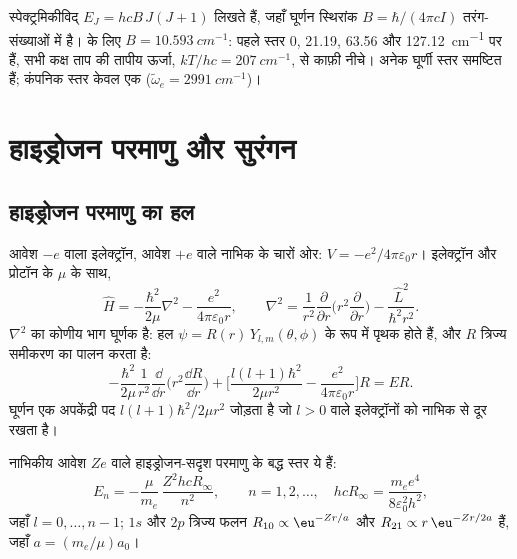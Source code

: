 \begin{example}[\ce{HCl} के घूर्णी स्तर]\label{ex:b3:quantum-model-systems:hcl}
स्पेक्ट्रमिकीविद् $E_J = hcB\,J(J+1)$ लिखते हैं, जहाँ घूर्णन स्थिरांक $B =
\hbar/(4\pi cI)$ तरंग-संख्याओं में है।  के लिए $B = \qty{10.593}{cm^{-1}}$:
पहले स्तर 0, 21.19, 63.56 और \qty{127.12}{cm^{-1}} पर हैं, सभी
कक्ष ताप की तापीय ऊर्जा, $kT/hc = \qty{207}{cm^{-1}}$, से काफ़ी नीचे।
अनेक घूर्णी स्तर समष्टित हैं; कंपनिक स्तर केवल एक
($\tilde\omega_e = \qty{2991}{cm^{-1}}$)।
\end{example}

\section{हाइड्रोजन परमाणु और सुरंगन}

\subsection*{हाइड्रोजन परमाणु का हल}

आवेश $-e$ वाला इलेक्ट्रॉन, आवेश $+e$ वाले नाभिक के चारों ओर: $V = -e^2/
4\pi\varepsilon_0r$। इलेक्ट्रॉन और प्रोटॉन के  $\mu$ के साथ,
\[
\hat H = -\frac{\hbar^2}{2\mu}\nabla^2 - \frac{e^2}{4\pi\varepsilon_0r},\qquad
\nabla^2 = \frac{1}{r^2}\frac{\partial}{\partial r}\Big(r^2\frac{\partial}{
\partial r}\Big) - \frac{\hat L^2}{\hbar^2r^2}.
\]
$\nabla^2$ का कोणीय भाग घूर्णक  है: हल
$\psi = R(r)\,Y_{l,m}(\theta,\phi)$ के रूप में पृथक होते हैं, और $R$ त्रिज्य
समीकरण का पालन करता है:
\[
-\frac{\hbar^2}{2\mu}\frac{1}{r^2}\frac{\dd}{\dd r}\Big(r^2\frac{\dd R}{\dd r}
\Big) + \Big[\frac{l(l+1)\hbar^2}{2\mu r^2} - \frac{e^2}{4\pi\varepsilon_0r}
\Big]R = ER.
\]
घूर्णन एक अपकेंद्री पद $l(l+1)\hbar^2/2\mu r^2$ जोड़ता है जो
$l > 0$ वाले इलेक्ट्रॉनों को नाभिक से दूर रखता है।

\begin{theorem}[हाइड्रोजन परमाणु के स्तर]\label{thm:b3:quantum-model-systems:hydrogen}
नाभिकीय आवेश $Ze$ वाले हाइड्रोजन-सदृश परमाणु के बद्ध स्तर ये हैं:
\[
E_n = -\frac{\mu}{m_e}\,\frac{Z^2hcR_\infty}{n^2}, \qquad n = 1, 2, \dots,
\quad hcR_\infty = \frac{m_ee^4}{8\varepsilon_0^2h^2},
\]
जहाँ $l = 0, \dots, n - 1$; $1s$ और $2p$ त्रिज्य फलन $R_{10}
\propto \eu^{-Zr/a}$ और $R_{21} \propto r\,\eu^{-Zr/2a}$ हैं, जहाँ $a =
(m_e/\mu)a_0$।
\end{theorem}

